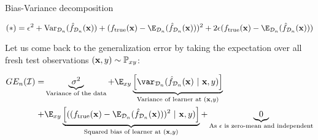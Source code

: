 \documentclass[11pt,compress,t,notes=noshow, xcolor=table]{beamer}
\begin{document}
\begin{frame2}[footnotesize]{Bias-Variance decomposition}

$$
(*) = \epsilon^2 + \text{Var}_{\D_n}(\fh_{\D_n}(\xv)) + 
(\ftrue(\xv) - \E_{\D_n}(\fh_{\D_n}(\xv)))^2
+2 \epsilon (\ftrue(\xv) - \E_{\D_n}(\fh_{\D_n}(\xv)))
$$

\vfill 

Let us come back to the generalization error by taking the expectation over all fresh test observations $(\mathbf{x}, y) \sim \mathbb{P}_{xy}$: 
\vfill

\begin{align*}
GE_n(\ind) 
=& \underbrace{\sigma^2}_{\text{Variance of the data}} + \E_{xy}\underbrace{\left[\var_{\D_n}(\fh_{\D_n}(\xv) ~|~\xv, y)\right]}_{\text{Variance of learner at } (\xv, y)} \\ 
+& \E_{xy}\underbrace{\left[((\ftrue(\xv)-\E_{\D_n}(\fh_{\D_n}(\xv)))^2~|~\xv, y)\right]}_{\text{Squared bias of learner at } (\xv, y)} + \underbrace{0}_{\text{As $\epsilon$ is zero-mean and independent}}
\end{align*}



\end{frame2}



\endlecture
\end{document}
